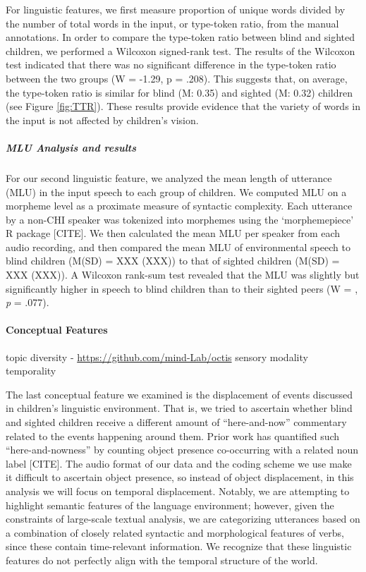 \documentclass[
  man]{apa6}
\let\oldparagraph\paragraph
\renewcommand{\paragraph}[1]{\oldparagraph{#1}\mbox{}}
\let\oldsubparagraph\subparagraph
\renewcommand{\subparagraph}[1]{\oldsubparagraph{#1}\mbox{}}
\begin{document}
For linguistic features, we first measure proportion of unique words divided by the number of total words in the input, or type-token ratio, from the manual annotations. In order to compare the type-token ratio between blind and sighted children, we performed a Wilcoxon signed-rank test. The results of the Wilcoxon test indicated that there was no significant difference in the type-token ratio between the two groups (W = -1.29, p = .208). This suggests that, on average, the type-token ratio is similar for blind (M: 0.35) and sighted (M: 0.32) children (see Figure \ref{fig:TTR}). These results provide evidence that the variety of words in the input is not affected by children's vision.

\hypertarget{mlu-analysis-and-results}{%
\subparagraph{MLU Analysis and results}\label{mlu-analysis-and-results}}

For our second linguistic feature, we analyzed the mean length of utterance (MLU) in the input speech to each group of children. We computed MLU on a morpheme level as a proximate measure of syntactic complexity. Each utterance by a non-CHI speaker was tokenized into morphemes using the `morphemepiece' R package {[}CITE{]}. We then calculated the mean MLU per speaker from each audio recording, and then compared the mean MLU of environmental speech to blind children (M(SD) = XXX (XXX)) to that of sighted children (M(SD) = XXX (XXX)). A Wilcoxon rank-sum test revealed that the MLU was slightly but significantly higher in speech to blind children than to their sighted peers (W = , \emph{p} = .077).

\hypertarget{conceptual-features}{%
\paragraph{Conceptual Features}\label{conceptual-features}}

topic diversity - \url{https://github.com/mind-Lab/octis}
sensory modality
temporality

The last conceptual feature we examined is the displacement of events discussed in children's linguistic environment. That is, we tried to ascertain whether blind and sighted children receive a different amount of ``here-and-now'' commentary related to the events happening around them. Prior work has quantified such ``here-and-nowness'' by counting object presence co-occurring with a related noun label {[}CITE{]}. The audio format of our data and the coding scheme we use make it difficult to ascertain object presence, so instead of object displacement, in this analysis we will focus on temporal displacement. Notably, we are attempting to highlight semantic features of the language environment; however, given the constraints of large-scale textual analysis, we are categorizing utterances based on a combination of closely related syntactic and morphological features of verbs, since these contain time-relevant information. We recognize that these linguistic features do not perfectly align with the temporal structure of the world.
\end{document}
